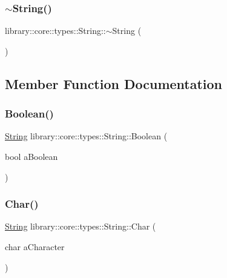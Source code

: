 \subsubsection{\texorpdfstring{$\sim$String()}{~String()}}
{\footnotesize\ttfamily library\+::core\+::types\+::\+String\+::$\sim$\+String (\begin{DoxyParamCaption}{ }\end{DoxyParamCaption})}



\subsection{Member Function Documentation}
\mbox{\label{classlibrary_1_1core_1_1types_1_1_string_afd43951e5c53b89428dc36db99a83842}} 
\subsubsection{\texorpdfstring{Boolean()}{Boolean()}}
{\footnotesize\ttfamily \mbox{\hyperlink{classlibrary_1_1core_1_1types_1_1_string}{String}} library\+::core\+::types\+::\+String\+::\+Boolean (\begin{DoxyParamCaption}\item[{bool}]{a\+Boolean }\end{DoxyParamCaption})\hspace{0.3cm}{\ttfamily [static]}}

\mbox{\label{classlibrary_1_1core_1_1types_1_1_string_abbc5a795da1a72d1456ba4950e62602c}} 
\subsubsection{\texorpdfstring{Char()}{Char()}}
{\footnotesize\ttfamily \mbox{\hyperlink{classlibrary_1_1core_1_1types_1_1_string}{String}} library\+::core\+::types\+::\+String\+::\+Char (\begin{DoxyParamCaption}\item[{char}]{a\+Character }\end{DoxyParamCaption})\hspace{0.3cm}{\ttfamily [static]}}


